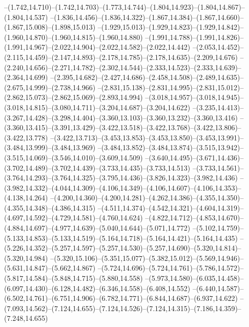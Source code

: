   --(1.742,14.710)--(1.742,14.703)--(1.773,14.744)--(1.804,14.923)--(1.804,14.867)--(1.804,14.537)%
  --(1.836,14.456)--(1.836,14.322)--(1.867,14.384)--(1.867,14.660)--(1.867,15.008)--(1.898,15.013)%
  --(1.929,15.013)--(1.929,14.823)--(1.929,14.842)--(1.960,14.870)--(1.960,14.815)--(1.960,14.880)%
  --(1.991,14.788)--(1.991,14.826)--(1.991,14.967)--(2.022,14.904)--(2.022,14.582)--(2.022,14.442)%
  --(2.053,14.452)--(2.115,14.459)--(2.147,14.893)--(2.178,14.785)--(2.178,14.635)--(2.209,14.676)%
  --(2.240,14.656)--(2.271,14.782)--(2.302,14.544)--(2.333,14.523)--(2.333,14.639)--(2.364,14.699)%
  --(2.395,14.682)--(2.427,14.686)--(2.458,14.508)--(2.489,14.635)--(2.675,14.999)--(2.738,14.966)%
  --(2.831,15.138)--(2.831,14.995)--(2.831,15.012)--(2.862,15.073)--(2.862,15.069)--(2.893,14.994)%
  --(3.018,14.957)--(3.018,14.945)--(3.018,14.815)--(3.080,14.711)--(3.204,14.687)--(3.204,14.622)%
  --(3.235,14.413)--(3.267,14.428)--(3.298,14.404)--(3.360,13.103)--(3.360,13.232)--(3.360,13.416)%
  --(3.360,13.415)--(3.391,13.429)--(3.422,13.518)--(3.422,13.768)--(3.422,13.806)--(3.422,13.778)%
  --(3.422,13.713)--(3.453,13.853)--(3.453,13.850)--(3.453,13.991)--(3.484,13.999)--(3.484,13.969)%
  --(3.484,13.852)--(3.484,13.874)--(3.515,13.942)--(3.515,14.069)--(3.546,14.010)--(3.609,14.509)%
  --(3.640,14.495)--(3.671,14.436)--(3.702,14.489)--(3.702,14.439)--(3.733,14.435)--(3.733,14.513)%
  --(3.733,14.561)--(3.764,14.293)--(3.764,14.325)--(3.795,14.436)--(3.826,14.323)--(3.982,14.436)%
  --(3.982,14.332)--(4.044,14.309)--(4.106,14.349)--(4.106,14.607)--(4.106,14.353)--(4.138,14.264)%
  --(4.200,14.360)--(4.200,14.281)--(4.262,14.386)--(4.355,14.350)--(4.355,14.348)--(4.386,14.315)%
  --(4.511,14.374)--(4.542,14.321)--(4.604,14.319)--(4.697,14.592)--(4.729,14.581)--(4.760,14.624)%
  --(4.822,14.712)--(4.853,14.670)--(4.884,14.697)--(4.977,14.639)--(5.040,14.644)--(5.071,14.772)%
  --(5.102,14.759)--(5.133,14.853)--(5.133,14.519)--(5.164,14.718)--(5.164,14.421)--(5.164,14.435)%
  --(5.226,14.352)--(5.257,14.597)--(5.257,14.530)--(5.257,14.690)--(5.320,14.814)--(5.320,14.984)%
  --(5.320,15.106)--(5.351,15.077)--(5.382,15.012)--(5.569,14.946)--(5.631,14.847)--(5.662,14.867)%
  --(5.724,14.696)--(5.724,14.761)--(5.786,14.572)--(5.817,14.584)--(5.848,14.715)--(5.880,14.558)%
  --(5.973,14.580)--(6.035,14.458)--(6.097,14.430)--(6.128,14.482)--(6.346,14.558)--(6.408,14.552)%
  --(6.440,14.587)--(6.502,14.761)--(6.751,14.906)--(6.782,14.771)--(6.844,14.687)--(6.937,14.622)%
  --(7.093,14.562)--(7.124,14.655)--(7.124,14.526)--(7.124,14.315)--(7.186,14.359)--(7.248,14.655)%
